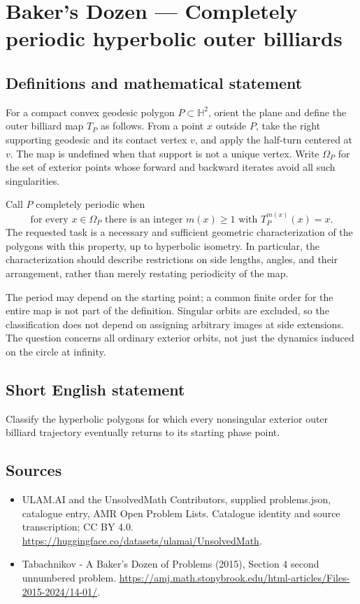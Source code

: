 \documentclass[11pt,a4paper]{article}
\begin{document}
\section*{Baker's Dozen — Completely periodic hyperbolic outer billiards}\label{statement}

\subsection{Definitions and mathematical statement}
For a compact convex geodesic polygon $P\subset\mathbb H^2$, orient the plane
and define the outer billiard map $T_P$ as follows. From a point $x$ outside
$P$, take the right supporting geodesic and its contact vertex $v$, and apply
the half-turn centered at $v$. The map is undefined when that support is
not a unique vertex. Write $\Omega_P$ for the set of exterior points whose
forward and backward iterates avoid all such singularities.

Call $P$ completely periodic when
\[
  \text{for every }x\in\Omega_P\text{ there is an integer }m(x)\ge1
  \text{ with }T_P^{m(x)}(x)=x.
\]
The requested task is a necessary and sufficient geometric characterization
of the polygons with this property, up to hyperbolic isometry. In particular,
the characterization should describe restrictions on side lengths, angles,
and their arrangement, rather than merely restating periodicity of the map.

The period may depend on the starting point; a common finite order for the
entire map is not part of the definition. Singular orbits are excluded, so
the classification does not depend on assigning arbitrary images at side
extensions. The question concerns all ordinary exterior orbits, not just
the dynamics induced on the circle at infinity.
\subsection{Short English statement}
Classify the hyperbolic polygons for which every nonsingular exterior
outer billiard trajectory eventually returns to its starting phase point.
\subsection{Sources}
\begin{itemize}
\item[S1] ULAM.AI and the UnsolvedMath Contributors, supplied problems.json, catalogue entry, AMR Open Problem Lists. Catalogue identity and source transcription; CC BY 4.0.
\url{https://huggingface.co/datasets/ulamai/UnsolvedMath}.
\item[S2] Tabachnikov - A Baker's Dozen of Problems (2015), Section 4 second unnumbered problem. 
\url{https://amj.math.stonybrook.edu/html-articles/Files-2015-2024/14-01/}.
\end{itemize}
\end{document}
